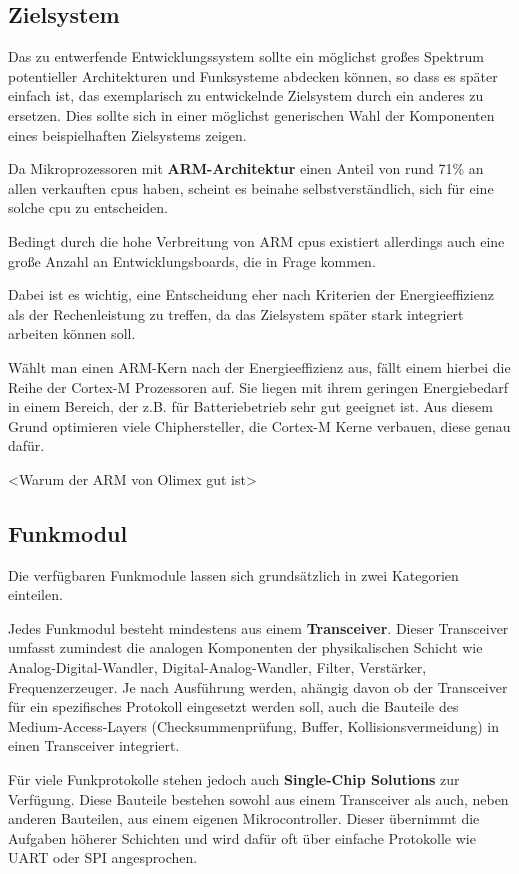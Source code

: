 \subsection{Zielsystem}
Das zu entwerfende Entwicklungssystem sollte ein möglichst
großes Spektrum potentieller Architekturen und Funksysteme abdecken können, so
dass es später einfach ist, das exemplarisch zu entwickelnde Zielsystem durch
ein anderes zu ersetzen. Dies sollte sich in einer möglichst generischen Wahl
der Komponenten eines beispielhaften Zielsystems zeigen.

Da Mikroprozessoren mit \textbf{ARM-Architektur} einen Anteil von rund
71\%\cite{IDC01} an allen verkauften \glspl{cpu} haben, scheint es beinahe
selbstverständlich, sich für eine solche \gls{cpu} zu entscheiden.

Bedingt durch die hohe Verbreitung von ARM \glspl{cpu} existiert allerdings
auch eine große Anzahl an Entwicklungsboards, die in Frage kommen.

Dabei ist es wichtig, eine Entscheidung eher nach Kriterien der Energieeffizienz
als der Rechenleistung zu treffen, da das Zielsystem später stark integriert
arbeiten können soll.

Wählt man einen ARM-Kern nach der Energieeffizienz aus, fällt einem hierbei die
Reihe der Cortex-M Prozessoren auf. Sie liegen mit ihrem geringen Energiebedarf
in einem Bereich, der z.B. für Batteriebetrieb sehr gut geeignet ist. Aus diesem
Grund optimieren viele Chiphersteller, die Cortex-M Kerne verbauen, diese genau
dafür.

 <Warum der ARM von Olimex gut ist>

\subsection{Funkmodul} Die verfügbaren Funkmodule lassen sich grundsätzlich in
zwei Kategorien einteilen.

Jedes Funkmodul besteht mindestens aus einem \textbf{Transceiver}. Dieser
Transceiver umfasst zumindest die analogen Komponenten der physikalischen
Schicht wie Analog-Digital-Wandler, Digital-Analog-Wandler, Filter, Verstärker,
Frequenzerzeuger. Je nach Ausführung werden, ahängig davon ob der Transceiver
für ein spezifisches Protokoll eingesetzt werden soll, auch die Bauteile des
Medium-Access-Layers (Checksummenprüfung, Buffer, Kollisionsvermeidung) in
einen Transceiver integriert.

Für viele Funkprotokolle stehen jedoch auch \textbf{Single-Chip Solutions}
zur Verfügung. Diese Bauteile bestehen sowohl aus einem Transceiver als auch,
neben anderen Bauteilen, aus einem eigenen Mikrocontroller. Dieser übernimmt die
Aufgaben höherer Schichten und wird dafür oft über einfache Protokolle wie UART
oder SPI angesprochen.

